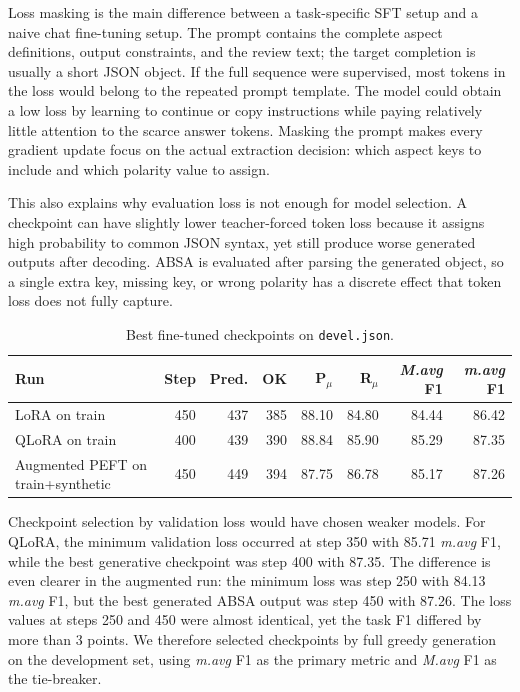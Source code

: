 \documentclass[11pt,a4paper]{article}
\newcommand{\mavg}{\textit{m.avg}}
\newcommand{\Mavg}{\textit{M.avg}}
\newcommand{\code}[1]{\texttt{#1}}
\begin{document}
Loss masking is the main difference between a task-specific SFT setup and a naive chat fine-tuning setup. The prompt contains the complete aspect definitions, output constraints, and the review text; the target completion is usually a short JSON object. If the full sequence were supervised, most tokens in the loss would belong to the repeated prompt template. The model could obtain a low loss by learning to continue or copy instructions while paying relatively little attention to the scarce answer tokens. Masking the prompt makes every gradient update focus on the actual extraction decision: which aspect keys to include and which polarity value to assign.

This also explains why evaluation loss is not enough for model selection. A checkpoint can have slightly lower teacher-forced token loss because it assigns high probability to common JSON syntax, yet still produce worse generated outputs after decoding. ABSA is evaluated after parsing the generated object, so a single extra key, missing key, or wrong polarity has a discrete effect that token loss does not fully capture.

\begin{table}[H]
    \centering
    \small
    \setlength{\tabcolsep}{4pt}
    \caption{Best fine-tuned checkpoints on \code{devel.json}.}
    \label{tab:finetune}
    \begin{tabular}{@{}lrrrrrrr@{}}
        \toprule
        Run & Step & Pred. & OK & P$_\mu$ & R$_\mu$ & \Mavg{} F1 & \mavg{} F1 \\
        \midrule
        LoRA on train & 450 & 437 & 385 & 88.10 & 84.80 & 84.44 & 86.42 \\
        QLoRA on train & 400 & 439 & 390 & 88.84 & 85.90 & 85.29 & 87.35 \\
        Augmented PEFT on train+synthetic & 450 & 449 & 394 & 87.75 & 86.78 & 85.17 & 87.26 \\
        \bottomrule
    \end{tabular}
\end{table}

Checkpoint selection by validation loss would have chosen weaker models. For QLoRA, the minimum validation loss occurred at step 350 with 85.71 \mavg{} F1, while the best generative checkpoint was step 400 with 87.35. The difference is even clearer in the augmented run: the minimum loss was step 250 with 84.13 \mavg{} F1, but the best generated ABSA output was step 450 with 87.26. The loss values at steps 250 and 450 were almost identical, yet the task F1 differed by more than 3 points. We therefore selected checkpoints by full greedy generation on the development set, using \mavg{} F1 as the primary metric and \Mavg{} F1 as the tie-breaker.
\end{document}
